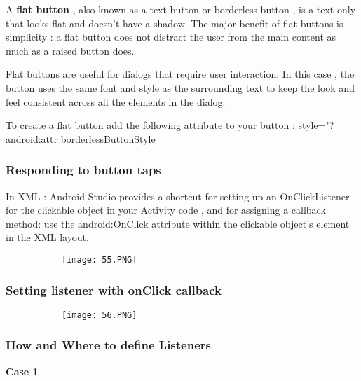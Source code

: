 \documentclass{article}
\begin{document}
  A \textbf{flat button} , also known as a text button or borderless button , is a text-only that looks flat and doesn't have a shadow. The major benefit of flat buttons is simplicity : a flat button does not distract the user from the main content as much as a raised button does.

  Flat buttons are useful for dialogs that require user interaction. In this case , the button uses the same font and style as the surrounding text to keep the look and feel consistent across all the elements in the dialog.

  To create a flat button add the following attribute to your button : style="?
android:attr borderlessButtonStyle

\subsubsection{Responding to button taps}

In XML : Android Studio provides a shortcut for setting up an OnClickListener for the clickable object in your Activity code , and for assigning a callback method: use the android:OnClick attribute within the clickable object's element in the XML layout.

  \begin{figure}[ht!]
  \centering
  \begin{subfigure}[b]{0.8\linewidth}
  \texttt{[image: 55.PNG]}
  \end{subfigure}
  \end{figure}

  \subsubsection{Setting listener with onClick callback}

  \begin{figure}[ht!]
  \centering
  \begin{subfigure}[b]{0.8\linewidth}
  \texttt{[image: 56.PNG]}
  \end{subfigure}
  \end{figure}

\vspace{50mm}

  \subsubsection{How and Where to define Listeners}

\textbf{Case 1}
  
\end{document}
